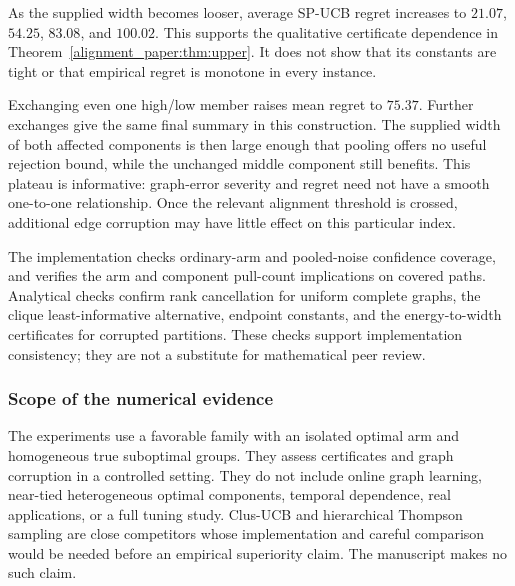 As the supplied width becomes looser, average SP-UCB regret increases to $21.07$, $54.25$, $83.08$, and $100.02$. This supports the qualitative certificate dependence in Theorem~\ref{alignment_paper:thm:upper}. It does not show that its constants are tight or that empirical regret is monotone in every instance.

Exchanging even one high/low member raises mean regret to $75.37$. Further exchanges give the same final summary in this construction. The supplied width of both affected components is then large enough that pooling offers no useful rejection bound, while the unchanged middle component still benefits. This plateau is informative: graph-error severity and regret need not have a smooth one-to-one relationship. Once the relevant alignment threshold is crossed, additional edge corruption may have little effect on this particular index.

The implementation checks ordinary-arm and pooled-noise confidence coverage, and verifies the arm and component pull-count implications on covered paths. Analytical checks confirm rank cancellation for uniform complete graphs, the clique least-informative alternative, endpoint constants, and the energy-to-width certificates for corrupted partitions. These checks support implementation consistency; they are not a substitute for mathematical peer review.

\subsubsection{Scope of the numerical evidence}
The experiments use a favorable family with an isolated optimal arm and homogeneous true suboptimal groups. They assess certificates and graph corruption in a controlled setting. They do not include online graph learning, near-tied heterogeneous optimal components, temporal dependence, real applications, or a full tuning study. Clus-UCB and hierarchical Thompson sampling are close competitors whose implementation and careful comparison would be needed before an empirical superiority claim. The manuscript makes no such claim.

